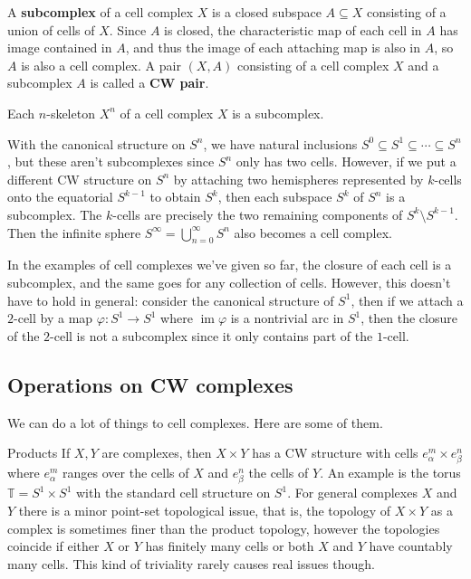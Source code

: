 \begin{definition}
    A \textbf{subcomplex} of a cell complex $X$ is a closed subspace $A\subseteq X$ consisting of a union of cells of $X$. Since $A$ is closed, the characteristic map of each cell in $A$ has image contained in $A$, and thus the image of each attaching map is also in $A$, so $A$ is also a cell complex. A pair $(X,A)$ consisting of a cell complex $X$ and a subcomplex $A$ is called a \textbf{CW pair}.
\end{definition}
\begin{example}
    Each $n$-skeleton $X^n $ of a cell complex $X$ is a subcomplex.
\end{example}
\begin{example}
    With the canonical structure on $S^n $, we have natural inclusions $S^0\subseteq S^1\subseteq \cdots \subseteq S^n $, but these aren't subcomplexes since $S^n $ only has two cells. However, if we put a different CW structure on $S^n $ by attaching two hemispheres represented by $k$-cells onto the equatorial $S^{k-1}$ to obtain $S^k$, then each subspace $S^k$ of $S^n $ is a subcomplex. The $k$-cells are precisely the two remaining components of $S^k \setminus S^{k-1}$. Then the infinite sphere $S^{\infty}=\bigcup_{n=0} ^{\infty}S^n $ also becomes a cell complex. 
\end{example}
In the examples of cell complexes we've given so far, the closure of each cell is a subcomplex, and the same goes for any collection of cells. However, this doesn't have to hold in general: consider the canonical structure of $S^1 $, then if we attach a $2$-cell by a map $\varphi \colon  S^1 \to S^1 $ where $\operatorname{im}\varphi $ is a nontrivial arc in $S^1 $, then the closure of the $2$-cell is not a subcomplex since it only contains part of the $1$-cell.
\subsection{Operations on CW complexes}
We can do a lot of things to cell complexes. Here are some of them.
\begin{namedthing}{Products}
    If $X,Y$ are complexes, then $X\times Y$ has a CW structure with cells $e_{\alpha }^m\times e_{\beta }^n $ where $e_{\alpha }^m$ ranges over the cells of $X$ and $e_{\beta }^n $ the cells of $Y$. An example is the torus $\mathbb{T}=S^1 \times S^1 $ with the standard cell structure on $S^1 $. For general complexes $X$ and $Y$ there is a minor point-set topological issue, that is, the topology of $X\times Y$ as a complex is sometimes finer than the product topology, however the topologies coincide if either $X$ or $Y$ has finitely many cells or both $X$ and $Y$ have countably many cells. This kind of triviality rarely causes real issues though.
\end{namedthing}

